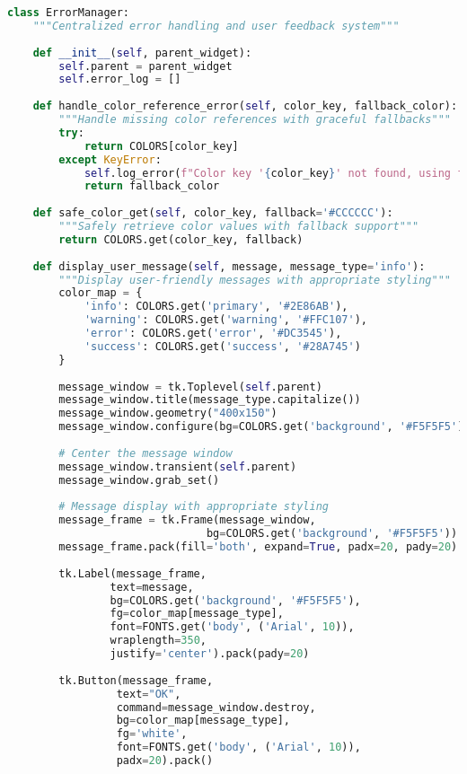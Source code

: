 \documentclass[binding=0.6cm]{sapthesis}
\begin{document}
\begin{lstlisting}[language=Python, caption=Enhanced Error Handling Implementation]
class ErrorManager:
    """Centralized error handling and user feedback system"""
    
    def __init__(self, parent_widget):
        self.parent = parent_widget
        self.error_log = []
        
    def handle_color_reference_error(self, color_key, fallback_color):
        """Handle missing color references with graceful fallbacks"""
        try:
            return COLORS[color_key]
        except KeyError:
            self.log_error(f"Color key '{color_key}' not found, using fallback")
            return fallback_color
    
    def safe_color_get(self, color_key, fallback='#CCCCCC'):
        """Safely retrieve color values with fallback support"""
        return COLORS.get(color_key, fallback)
    
    def display_user_message(self, message, message_type='info'):
        """Display user-friendly messages with appropriate styling"""
        color_map = {
            'info': COLORS.get('primary', '#2E86AB'),
            'warning': COLORS.get('warning', '#FFC107'),
            'error': COLORS.get('error', '#DC3545'),
            'success': COLORS.get('success', '#28A745')
        }
        
        message_window = tk.Toplevel(self.parent)
        message_window.title(message_type.capitalize())
        message_window.geometry("400x150")
        message_window.configure(bg=COLORS.get('background', '#F5F5F5'))
        
        # Center the message window
        message_window.transient(self.parent)
        message_window.grab_set()
        
        # Message display with appropriate styling
        message_frame = tk.Frame(message_window, 
                               bg=COLORS.get('background', '#F5F5F5'))
        message_frame.pack(fill='both', expand=True, padx=20, pady=20)
        
        tk.Label(message_frame,
                text=message,
                bg=COLORS.get('background', '#F5F5F5'),
                fg=color_map[message_type],
                font=FONTS.get('body', ('Arial', 10)),
                wraplength=350,
                justify='center').pack(pady=20)
        
        tk.Button(message_frame,
                 text="OK",
                 command=message_window.destroy,
                 bg=color_map[message_type],
                 fg='white',
                 font=FONTS.get('body', ('Arial', 10)),
                 padx=20).pack()
\end{lstlisting}
\end{document}

